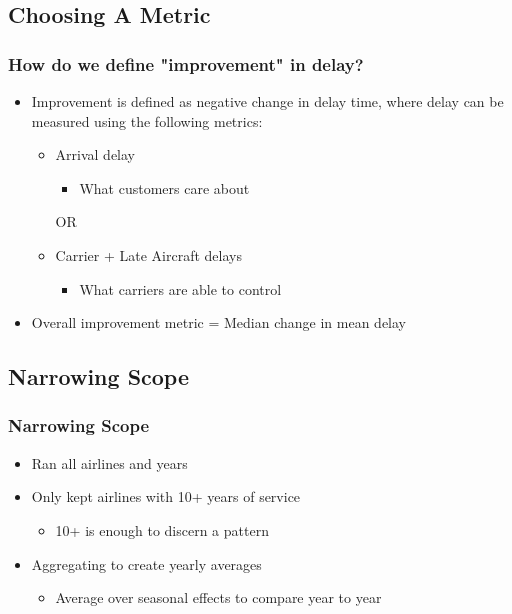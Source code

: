 \documentclass{beamer}
\begin{document}
\subsection{Choosing A Metric}
\begin{frame}
\frametitle{How do we define "improvement" in delay?}
\begin{itemize}
\item Improvement is defined as negative change in delay time, where delay can be measured using the following metrics:

\begin{itemize}
\item Arrival delay 
\begin{itemize}
\item What customers care about
\end{itemize}

OR
\item Carrier + Late Aircraft delays 
\begin{itemize}
\item What carriers are able to control 
\end{itemize}
\end{itemize}
\item Overall improvement metric = Median change in mean delay 
\end{itemize}

\end{frame}

\subsection{Narrowing Scope}
\begin{frame}
\frametitle{Narrowing Scope}
\begin{itemize}
\item Ran all airlines and years 
\item Only kept airlines with 10+ years of service 
\begin{itemize}
\item 10+ is enough to discern a pattern
\end{itemize}
\item Aggregating to create yearly averages 
\begin{itemize}
\item Average over seasonal effects to compare year to year 
\end{itemize}
\end{itemize}

\end{frame}
\end{document}
